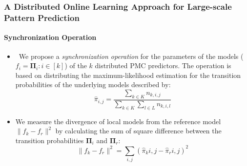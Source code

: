 \frame
{
	\frametitle{A Distributed Online Learning Approach for Large-scale Pattern Prediction}
		\framesubtitle{Synchronization Operation}
	\begin{itemize}[]

	\item<1->\ We propose a \textit{synchronization operation} for the parameters of the models ($f_i=\boldsymbol{\Pi}_i :i \in[k]$) of the $k$ distributed PMC predictors. The operation is based on distributing the maximum-likelihood estimation for the transition probabilities of the underlying  models described by: 
	\begin{equation*}
	\label{eq:dis_pi_estim}
	\hat{\pi}_{i,j}=\frac{\sum_{k \in K} n_{k,i,j}}{\sum_{k \in K} \sum_{l \in L} n_{k,i,l}}
	\end{equation*}
	
\item<2-> We measure the divergence of local models from the reference model  $\|f_k - f_r\|^2$ by calculating the sum of square difference between the transition probabilities  $\boldsymbol{\Pi}_i$ and  $\boldsymbol{\Pi}_r$:
	\begin{equation*}
	\label{eq:dis_pi_varinace}
	\|f_k - f_r\|^2=\sum_{i,j} (\hat{\pi}_k{i,j} -\hat{\pi}_r{i,j})^2
	\end{equation*}

	
\end{itemize}
}